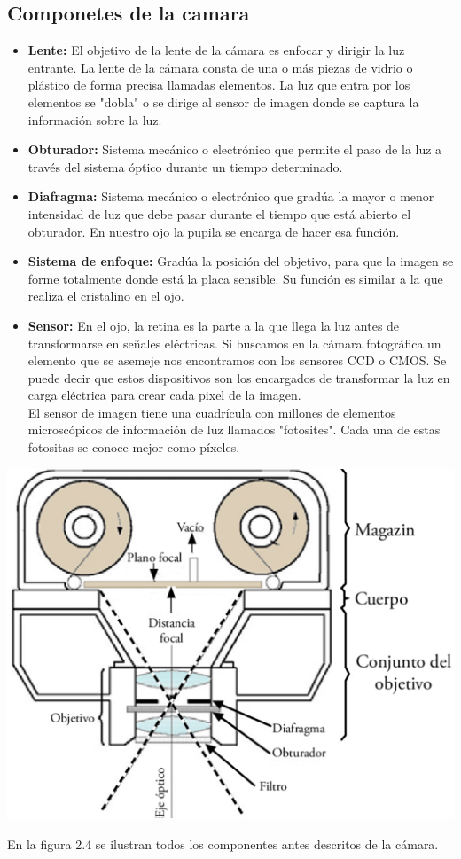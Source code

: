 \subsection{Componetes de la camara}
\begin{itemize}
	\item \textbf{Lente: }El objetivo de la lente de la cámara es enfocar y dirigir
	      la luz entrante. La lente de la cámara consta de una o más piezas de vidrio o
	      plástico de forma precisa llamadas elementos. La luz que entra por los elementos
	      se "dobla" o se dirige al sensor de imagen donde se captura la información sobre
	      la luz.
	\item \textbf{Obturador:} Sistema mecánico o electrónico que permite el paso de la
	      luz a través del sistema óptico  durante un tiempo determinado.
	\item \textbf{Diafragma: }Sistema mecánico o electrónico que gradúa la mayor o
	      menor intensidad de luz que debe   pasar durante el tiempo que está abierto el
	      obturador. En nuestro ojo la pupila se encarga de hacer esa función.
	\item \textbf{Sistema de enfoque: }Gradúa la posición del  objetivo, para que la
	      imagen se forme totalmente donde  está la placa sensible. Su función es similar a
	      la que realiza el cristalino en el ojo.
	\item \textbf{Sensor: }En el ojo, la retina es la parte a la que llega la luz
	      antes de transformarse en señales eléctricas. Si buscamos en la cámara fotográfica
	      un elemento que se asemeje nos encontramos con los sensores CCD o CMOS. Se
	      puede decir que estos dispositivos son los encargados de transformar la luz en
	      carga eléctrica para crear cada pixel de la imagen.\\
	      El sensor de imagen tiene una cuadrícula con millones de elementos microscópicos
	      de información de luz llamados "fotosites".
	      Cada una de estas fotositas se conoce mejor como píxeles.
\end{itemize}
\begin{center}
	\includegraphics[width=0.80 \textwidth]{Contenido/Cuerpo/Capitulo2/Fig1_5.eps}
	\label{fig:MarcoTeorico:Fig4}
\end{center}
En la figura 2.4 se ilustran todos los componentes antes descritos de la cámara.

